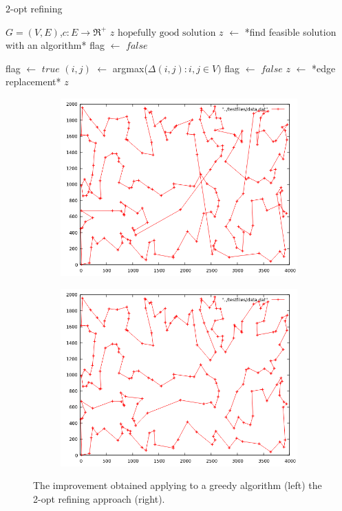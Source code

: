 \begin{algorithm}
	\caption{$2$-opt refining}\label{algo:2-opt}
	\begin{algorithmic}[1]
		\Require $G=(V,E)$,$ c:E\rightarrow \Re^+$
		\Ensure $z\text{ hopefully good solution}$
		\State $z$ $\gets$ *find feasible solution with an algorithm*
		\State flag $\gets$ $false$
		
			\State flag $\gets$ $true$
			\State $(i, j)$ $\gets$ argmax($\Delta(i, j):i, j\in V)$
				\State flag $\gets$ $false$
				\State $z$ $\gets$ *edge replacement*
			\EndIf
		\EndWhile
		\State \Return $z$
	\end{algorithmic}
\end{algorithm}

\begin{figure}
	\centering
	
	\begin{subfigure}[b]{0.45\textwidth}
		\includegraphics[width=\textwidth]{images/kroA_greedy.png}
	\end{subfigure}
	\hfill
	\begin{subfigure}[b]{0.45\textwidth}
		\includegraphics[width=\textwidth]{images/2_opt.png}
	\end{subfigure}
	\caption{The improvement obtained applying to a greedy algorithm (left) the 2-opt refining approach (right).}
\end{figure}